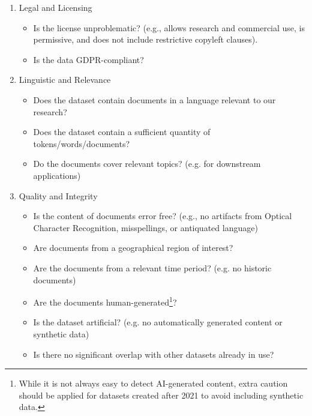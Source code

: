 \begin{enumerate}
    \item Legal and Licensing
    \begin{itemize}
        \item Is the license unproblematic? (e.g., allows research and commercial use, is permissive, and does not include restrictive copyleft clauses). 
        \item Is the data GDPR-compliant?
    \end{itemize}
    
    \item Linguistic and Relevance
    
    \begin{itemize}
        \item Does the dataset contain documents in a language relevant to our research?
        \item Does the dataset contain a sufficient quantity of tokens/words/documents? 
        \item Do the documents cover relevant topics? 
        (e.g. for downstream applications)
    \end{itemize}
    
    \item Quality and Integrity
    
    \begin{itemize}
        \item Is the content of documents error free? 
        (e.g., no artifacts from Optical Character Recognition, misspellings, or antiquated language)
        \item Are documents from a geographical region of interest? 
        \item Are the documents from a relevant time period?
        (e.g. no historic documents)
        \item Are the documents human-generated\footnote{While it is not always easy to detect AI-generated content, extra caution should be applied for datasets created after 2021 to avoid including synthetic data.}?
        \item Is the dataset artificial?
        (e.g. no automatically generated content or synthetic data)
        \item Is there no significant overlap with other datasets already in use?
    \end{itemize}
    

\end{enumerate}
